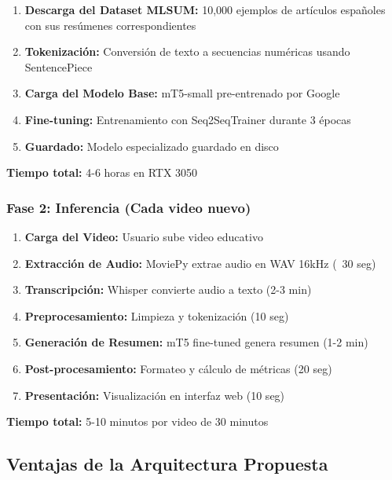 \documentclass[12pt,a4paper]{article}
\begin{document}
\begin{enumerate}[leftmargin=*]
    \item \textbf{Descarga del Dataset MLSUM:} 10,000 ejemplos de artículos españoles con sus resúmenes correspondientes
    \item \textbf{Tokenización:} Conversión de texto a secuencias numéricas usando SentencePiece
    \item \textbf{Carga del Modelo Base:} mT5-small pre-entrenado por Google
    \item \textbf{Fine-tuning:} Entrenamiento con Seq2SeqTrainer durante 3 épocas
    \item \textbf{Guardado:} Modelo especializado guardado en disco
\end{enumerate}

\textbf{Tiempo total:} 4-6 horas en RTX 3050

\subsubsection{Fase 2: Inferencia (Cada video nuevo)}

\begin{enumerate}[leftmargin=*]
    \item \textbf{Carga del Video:} Usuario sube video educativo
    \item \textbf{Extracción de Audio:} MoviePy extrae audio en WAV 16kHz (~30 seg)
    \item \textbf{Transcripción:} Whisper convierte audio a texto (2-3 min)
    \item \textbf{Preprocesamiento:} Limpieza y tokenización (10 seg)
    \item \textbf{Generación de Resumen:} mT5 fine-tuned genera resumen (1-2 min)
    \item \textbf{Post-procesamiento:} Formateo y cálculo de métricas (20 seg)
    \item \textbf{Presentación:} Visualización en interfaz web (10 seg)
\end{enumerate}

\textbf{Tiempo total:} 5-10 minutos por video de 30 minutos

\newpage

\subsection{Ventajas de la Arquitectura Propuesta}
\end{document}
